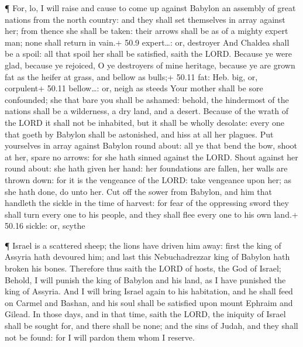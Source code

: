  ¶ For, lo, I will raise and cause to come up against
Babylon an assembly of great nations from the north country: and they
shall set themselves in array against her; from thence she shall be
taken: their arrows shall be as of a mighty expert man; none shall
return in vain.+ 50.9 expert\ldots: or, destroyer  And
Chaldea shall be a spoil: all that spoil her shall be satisfied, saith
the LORD.  Because ye were glad, because ye rejoiced, O ye
destroyers of mine heritage, because ye are grown fat as the heifer at
grass, and bellow as bulls;+ 50.11 fat: Heb. big, or, corpulent+ 50.11
bellow\ldots: or, neigh as steeds  Your mother shall be
sore confounded; she that bare you shall be ashamed: behold, the
hindermost of the nations shall be a wilderness, a dry land, and a
desert.  Because of the wrath of the LORD it shall not be
inhabited, but it shall be wholly desolate: every one that goeth by
Babylon shall be astonished, and hiss at all her plagues. 
Put yourselves in array against Babylon round about: all ye that bend
the bow, shoot at her, spare no arrows: for she hath sinned against the
LORD.  Shout against her round about: she hath given her
hand: her foundations are fallen, her walls are thrown down: for it is
the vengeance of the LORD: take vengeance upon her; as she hath done, do
unto her.  Cut off the sower from Babylon, and him that
handleth the sickle in the time of harvest: for fear of the oppressing
sword they shall turn every one to his people, and they shall flee every
one to his own land.+ 50.16 sickle: or, scythe

 ¶ Israel is a scattered sheep; the lions have driven him
away: first the king of Assyria hath devoured him; and last this
Nebuchadrezzar king of Babylon hath broken his bones. 
Therefore thus saith the LORD of hosts, the God of Israel; Behold, I
will punish the king of Babylon and his land, as I have punished the
king of Assyria.  And I will bring Israel again to his
habitation, and he shall feed on Carmel and Bashan, and his soul shall
be satisfied upon mount Ephraim and Gilead.  In those days,
and in that time, saith the LORD, the iniquity of Israel shall be sought
for, and there shall be none; and the sins of Judah, and they shall not
be found: for I will pardon them whom I reserve.

